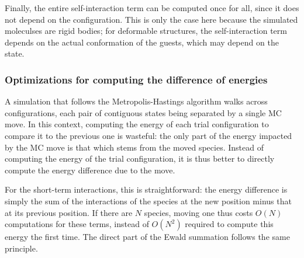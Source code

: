\documentclass[main.tex]{subfiles}
\begin{document}

Finally, the entire self-interaction term can be computed once for all, since it does not depend on the configuration. This is only the case here because the simulated moleculses are rigid bodies; for deformable structures, the self-interaction term depends on the actual conformation of the guests, which may depend on the state.

\subsubsection{Optimizations for computing the difference of energies}

\label{energydifference}

A simulation that follows the Metropolis-Hastings algorithm walks across configurations, each pair of contiguous states being separated by a single MC move. In this context, computing the energy of each trial configuration to compare it to the previous one is wasteful: the only part of the energy impacted by the MC move is that which stems from the moved species. Instead of computing the energy of the trial configuration, it is thus better to directly compute the energy difference due to the move.

For the short-term interactions, this is straightforward: the energy difference is simply the sum of the interactions of the species at the new position minus that at its previous position. If there are $N$ species, moving one thus costs $O(N)$ computations for these terms, instead of $O(N^2)$ required to compute this energy the first time. The direct part of the Ewald summation follows the same principle.
\end{document}
